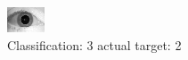 \begin{figure}[h!]
\begin{center}
\includegraphics[width=0.60\columnwidth]{figures/ID1610_class_3_target_2.png}
\end{center}
\caption{ Classification: 3 actual target: 2}
\label{fig:ID1610_class_3_target_2}
\end{figure}

